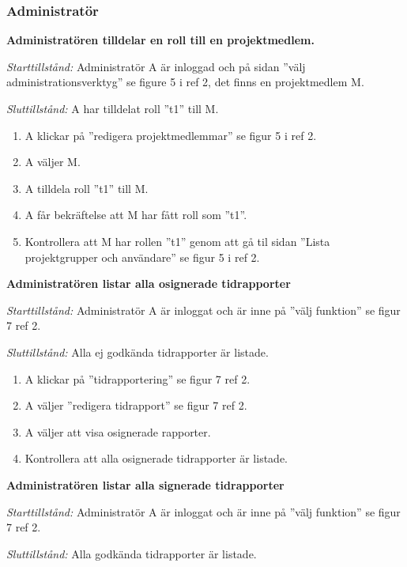 \documentclass[a4paper]{article}
\begin{document}
\subsubsection{Administratör}
\begin{FT}
\item
\textbf{Administratören tilldelar en roll till en projektmedlem.}

\emph{Starttillstånd:} Administratör A är inloggad och på sidan ''välj administrationsverktyg'' se figure 5 i ref 2, det finns en projektmedlem M.

\emph{Sluttillstånd:} A har tilldelat roll ''t1'' till M.

\begin{enumerate}
\item A klickar på ''redigera projektmedlemmar'' se figur 5 i ref 2.
\item A väljer M.
\item A tilldela roll ''t1'' till M.
\item A får bekräftelse att M har fått roll som ''t1''.
\item Kontrollera att M har rollen ''t1'' genom att gå til sidan ''Lista projektgrupper och användare'' se figur 5 i ref 2.
\end{enumerate}

\item %
\textbf{Administratören listar alla osignerade tidrapporter}

\emph{Starttillstånd:} Administratör A är inloggat och är inne på ''välj funktion'' se figur 7 ref 2.

\emph{Sluttillstånd:} Alla ej godkända tidrapporter är listade.

\begin{enumerate}
\item A klickar på ''tidrapportering'' se figur 7 ref 2.
\item A väljer ''redigera tidrapport'' se figur 7 ref 2.
\item A väljer att visa osignerade rapporter.
\item Kontrollera att alla osignerade tidrapporter är listade.
\end{enumerate}

\item %
\textbf{Administratören listar alla signerade tidrapporter}

\emph{Starttillstånd:} Administratör A är inloggat och är inne på ''välj funktion'' se figur 7 ref 2.

\emph{Sluttillstånd:} Alla godkända tidrapporter är listade.


\end{FT}
\end{document}
